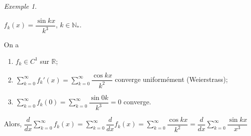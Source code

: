 \documentclass{report}
\newcommand*{\dsum}[4]{\displaystyle\sum_{#1=#2}^{#3}#4}
\newcommand*{\reels}{\mathbb{R}}
\newcommand*{\naturels}{\mathbb{N}}
\theoremstyle{definition}
\theoremstyle{remark}
\newtheorem*{exem}{Exemple}
\begin{document}
	\begin{exem}~

		$f_k(x) = \dfrac{\sin kx}{k^3}$, $k \in \naturels_*$.

		On a
		\begin{enumerate}[label=\roman*)]
			\item $f_k \in C^1$ sur $\reels$;
			\item $\dsum{k}{0}{\infty}{f_k'(x)} = \dsum{k}{0}{\infty}{\dfrac{\cos kx}{k^2}}$ converge uniform\'ement (Weierstrass);
			\item $\dsum{k}{0}{\infty}{f_k(0)} = \dsum{k}{0}{\infty}{\dfrac{\sin 0k}{k^3}} = 0$ converge.
		\end{enumerate}

		Alors, $\dfrac{d}{dx}\dsum{k}{0}{\infty}{f_k(x)} = \dsum{k}{0}{\infty}{\dfrac{d}{dx}f_k(x)} = \dsum{k}{0}{\infty}{\dfrac{\cos kx}{k^2}} = \dfrac{d}{dx}\dsum{k}{0}{\infty}{\dfrac{\sin kx}{x^3}}$
	\end{exem}
\end{document}
